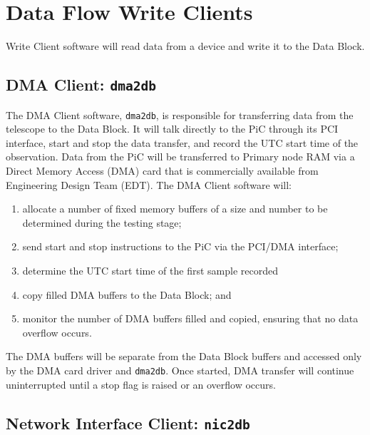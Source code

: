 \newpage
\section{Data Flow Write Clients}

Write Client software will read data from a device and write it to
the Data Block.

\subsection{DMA Client: {\tt dma2db}}

The DMA Client software, {\tt dma2db}, is responsible for transferring
data from the telescope to the Data Block.  It will talk directly to
the PiC through its PCI interface, start and stop the data transfer,
and record the UTC start time of the observation.  Data from the PiC
will be transferred to Primary node RAM via a Direct Memory Access
(DMA) card that is commercially available from Engineering Design Team
(EDT).  The DMA Client software will:

\begin{enumerate}

\item allocate a number of fixed memory buffers of a size and number
to be determined during the testing stage;

\item send start and stop instructions to the PiC via the PCI/DMA interface;

\item determine the UTC start time of the first sample recorded

\item copy filled DMA buffers to the Data Block; and

\item monitor the number of DMA buffers filled and copied, ensuring that
no data overflow occurs.

\end{enumerate}

\noindent
The DMA buffers will be separate from the Data Block buffers and
accessed only by the DMA card driver and {\tt dma2db}.  Once started,
DMA transfer will continue uninterrupted until a stop flag is raised
or an overflow occurs.

\subsection{Network Interface Client: {\tt nic2db}}

